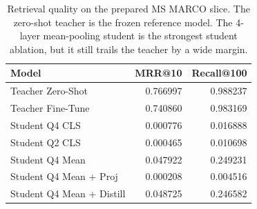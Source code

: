\begin{table}[H]
\centering
\footnotesize
\renewcommand{\arraystretch}{1.05}
\caption{Retrieval quality on the prepared MS MARCO slice. The zero-shot teacher is the frozen reference model. The 4-layer mean-pooling student is the strongest student ablation, but it still trails the teacher by a wide margin.}
\label{tab:main-results}
\setlength{\tabcolsep}{4pt}
\begin{tabular}{@{}lrr@{}}
\toprule
Model & MRR@10 & Recall@100 \\
\midrule
Teacher Zero-Shot & 0.766997 & 0.988237 \\
Teacher Fine-Tune & 0.740860 & 0.983169 \\
Student Q4 CLS & 0.000776 & 0.016888 \\
Student Q2 CLS & 0.000465 & 0.010698 \\
Student Q4 Mean & 0.047922 & 0.249231 \\
Student Q4 Mean + Proj & 0.000208 & 0.004516 \\
Student Q4 Mean + Distill & 0.048725 & 0.246582 \\
\bottomrule
\end{tabular}
\end{table}
